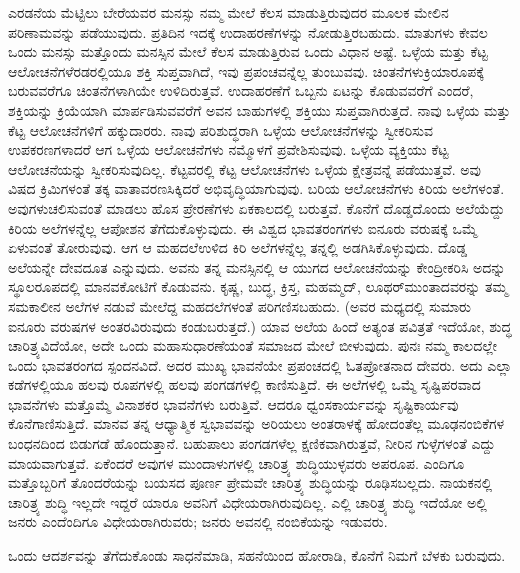 ಎರಡನೆಯ ಮೆಟ್ಟಿಲು ಬೇರೆಯವರ ಮನಸ್ಸು ನಮ್ಮ ಮೇಲೆ ಕೆಲಸ ಮಾಡುತ್ತಿರುವುದರ ಮೂಲಕ ಮೇಲಿನ ಪರಿಣಾಮವನ್ನು ಪಡೆಯುವುದು. ಪ್ರತಿದಿನ ಇದಕ್ಕೆ ಉದಾಹರಣೆಗಳನ್ನು ನೋಡುತ್ತಿರಬಹುದು. ಮಾತುಗಳು ಕೇವಲ ಒಂದು ಮನಸ್ಸು ಮತ್ತೊಂದು ಮನಸ್ಸಿನ ಮೇಲೆ ಕೆಲಸ ಮಾಡುತ್ತಿರುವ ಒಂದು ವಿಧಾನ ಅಷ್ಟೆ. ಒಳ್ಳೆಯ ಮತ್ತು ಕೆಟ್ಟ ಆಲೋಚನೆ\-ಗಳೆರಡರಲ್ಲಿಯೂ ಶಕ್ತಿ ಸುಪ್ತವಾಗಿದೆ, ಇವು ಪ್ರಪಂಚವನ್ನೆಲ್ಲ ತುಂಬುವವು. ಚಿಂತನೆಗಳು\break ಕ್ರಿಯಾರೂಪಕ್ಕೆ ಬರುವವರೆಗೂ ಚಿಂತನೆಗಳಾಗಿಯೇ ಉಳಿದಿರುತ್ತವೆ. ಉದಾಹರಣೆಗೆ ಒಬ್ಬನು ಏಟನ್ನು ಕೊಡುವವರೆಗೆ ಎಂದರೆ, ಶಕ್ತಿಯನ್ನು ಕ್ರಿಯೆಯಾಗಿ ಮಾರ್ಪಡಿಸುವವರೆಗೆ ಅವನ ಬಾಹುಗಳಲ್ಲಿ ಶಕ್ತಿಯು ಸುಪ್ತವಾಗಿರುತ್ತದೆ. ನಾವು ಒಳ್ಳೆಯ ಮತ್ತು ಕೆಟ್ಟ ಆಲೋಚನೆಗಳಿಗೆ ಹಕ್ಕುದಾರರು. ನಾವು ಪರಿಶುದ್ಧರಾಗಿ ಒಳ್ಳೆಯ ಆಲೋಚನೆಗಳನ್ನು ಸ್ವೀಕರಿಸುವ ಉಪಕರಣಗಳಾದರೆ ಆಗ ಒಳ್ಳೆಯ ಆಲೋಚನೆಗಳು ನಮ್ಮೊಳಗೆ ಪ್ರವೇಶಿಸುವುವು. ಒಳ್ಳೆಯ ವ್ಯಕ್ತಿಯು ಕೆಟ್ಟ ಆಲೋಚನೆಯನ್ನು ಸ್ವೀಕರಿಸುವುದಿಲ್ಲ. ಕೆಟ್ಟವರಲ್ಲಿ ಕೆಟ್ಟ ಆಲೋಚನೆ\break ಗಳು ಒಳ್ಳೆಯ ಕ್ಷೇತ್ರವನ್ನೆ ಪಡೆಯುತ್ತವೆ. ಅವು ವಿಷದ ಕ್ರಿಮಿಗಳಂತೆ ತಕ್ಕ ವಾತಾವರಣ\break ಸಿಕ್ಕಿದರೆ ಅಭಿವೃದ್ಧಿಯಾಗುವುವು. ಬರಿಯ ಆಲೋಚನೆಗಳು ಕಿರಿಯ ಅಲೆಗಳಂತೆ. ಅವುಗಳು\break ಚಲಿಸುವಂತೆ ಮಾಡಲು ಹೊಸ ಪ್ರೇರಣೆಗಳು ಏಕಕಾಲದಲ್ಲಿ ಬರುತ್ತವೆ. ಕೊನೆಗೆ ದೊಡ್ಡದೊಂದು ಅಲೆಯೆದ್ದು ಕಿರಿಯ ಅಲೆಗಳನ್ನೆಲ್ಲ ಆಪೋಶನ ತೆಗೆದುಕೊಳ್ಳುವುದು. ಈ ವಿಶ್ವದ ಭಾವತರಂಗಗಳು ಐನೂರು ವರುಷಕ್ಕೆ ಒಮ್ಮೆ ಏಳುವಂತೆ ತೋರುವುವು. ಆಗ ಆ ಮಹದಲೆ\break ಉಳಿದ ಕಿರಿ ಅಲೆಗಳನ್ನೆಲ್ಲ ತನ್ನಲ್ಲಿ ಅಡಗಿಸಿಕೊಳ್ಳುವುದು. ದೊಡ್ಡ ಅಲೆಯನ್ನೇ ದೇವದೂತ ಎನ್ನುವುದು. ಅವನು ತನ್ನ ಮನಸ್ಸಿನಲ್ಲಿ ಆ ಯುಗದ ಆಲೋಚನೆಯನ್ನು ಕೇಂದ್ರೀಕರಿಸಿ ಅದನ್ನು ಸ್ಥೂಲರೂಪದಲ್ಲಿ ಮಾನವಕೋಟಿಗೆ ಕೊಡುವನು. ಕೃಷ್ಣ, ಬುದ್ಧ, ಕ್ರಿಸ್ತ, ಮಹಮ್ಮದ್​, ಲೂಥರ್​ ಮುಂತಾದವರನ್ನು ತಮ್ಮ ಸಮಕಾಲೀನ ಅಲೆಗಳ ನಡುವೆ ಮೇಲೆದ್ದ ಮಹದಲೆಗಳಂತೆ ಪರಿಗಣಿಸಬಹುದು. (ಅವರ ಮಧ್ಯದಲ್ಲಿ ಸುಮಾರು ಐನೂರು ವರುಷಗಳ ಅಂತರವಿರುವುದು ಕಂಡುಬರುತ್ತದೆ.) ಯಾವ ಅಲೆಯ ಹಿಂದೆ ಅತ್ಯಂತ ಪವಿತ್ರತೆ ಇದೆಯೋ, ಶುದ್ಧ ಚಾರಿತ್ರ್ಯವಿದೆಯೋ, ಅದೇ ಒಂದು ಮಹಾಸುಧಾರಣೆಯಂತೆ ಸಮಾಜದ ಮೇಲೆ ಬೀಳುವುದು. ಪುನಃ ನಮ್ಮ ಕಾಲದಲ್ಲೇ ಒಂದು ಭಾವತರಂಗದ ಸ್ಪಂದನವಿದೆ. ಅದರ ಮುಖ್ಯ ಭಾವನೆಯೇ ಪ್ರಪಂಚದಲ್ಲಿ ಓತಪ್ರೋತನಾದ ದೇವರು. ಅದು ಎಲ್ಲಾ ಕಡೆಗಳಲ್ಲಿಯೂ ಹಲವು ರೂಪಗಳಲ್ಲಿ ಹಲವು ಪಂಗಡಗಳಲ್ಲಿ ಕಾಣಿಸುತ್ತಿದೆ. ಈ ಅಲೆಗಳಲ್ಲಿ ಒಮ್ಮೆ ಸೃಷ್ಟಿಪರವಾದ ಭಾವನೆಗಳು ಮತ್ತೊಮ್ಮೆ ವಿನಾಶಕರ ಭಾವನೆಗಳು ಬರುತ್ತಿವೆ. ಆದರೂ ಧ್ವಂಸಕಾರ್ಯವನ್ನು ಸೃಷ್ಟಿಕಾರ್ಯವು ಕೊನೆಗಾಣಿಸುತ್ತಿದೆ. ಮಾನವ ತನ್ನ ಆಧ್ಯಾತ್ಮಿಕ ಸ್ವಭಾವವನ್ನು ಅರಿಯಲು ಅಂತರಾಳಕ್ಕೆ ಹೋದಂತೆಲ್ಲ ಮೂಢನಂಬಿಕೆಗಳ ಬಂಧನದಿಂದ ಬಿಡುಗಡೆ ಹೊಂದುತ್ತಾನೆ. ಬಹುಪಾಲು ಪಂಗಡಗಳೆಲ್ಲ ಕ್ಷಣಿಕವಾಗಿರುತ್ತವೆ, ನೀರಿನ ಗುಳ್ಳೆಗಳಂತೆ ಎದ್ದು ಮಾಯವಾಗುತ್ತವೆ. ಏಕೆಂದರೆ ಅವುಗಳ ಮುಂದಾಳುಗಳಲ್ಲಿ ಚಾರಿತ್ರ್ಯ ಶುದ್ಧಿಯುಳ್ಳವರು ಅಪರೂಪ. ಎಂದಿಗೂ ಮತ್ತೊಬ್ಬರಿಗೆ ತೊಂದರೆಯನ್ನು ಬಯಸದ ಪೂರ್ಣ ಪ್ರೇಮವೇ ಚಾರಿತ್ರ್ಯ ಶುದ್ಧಿಯನ್ನು ರೂಢಿಸಬಲ್ಲದು. ನಾಯಕನಲ್ಲಿ ಚಾರಿತ್ರ್ಯ ಶುದ್ಧಿ ಇಲ್ಲದೇ ಇದ್ದರೆ ಯಾರೂ ಅವನಿಗೆ ವಿಧೇಯರಾಗಿರುವುದಿಲ್ಲ. ಎಲ್ಲಿ ಚಾರಿತ್ರ್ಯ ಶುದ್ಧಿ ಇದೆಯೋ ಅಲ್ಲಿ ಜನರು ಎಂದೆಂದಿಗೂ ವಿಧೇಯರಾಗಿರುವರು; ಜನರು ಅವನಲ್ಲಿ ನಂಬಿಕೆಯನ್ನು ಇಡುವರು.

ಒಂದು ಆದರ್ಶವನ್ನು ತೆಗೆದುಕೊಂಡು ಸಾಧನೆಮಾಡಿ, ಸಹನೆಯಿಂದ ಹೋರಾಡಿ, ಕೊನೆಗೆ ನಿಮಗೆ ಬೆಳಕು ಬರುವುದು.

\vskip -0.2cm

\delimiter

